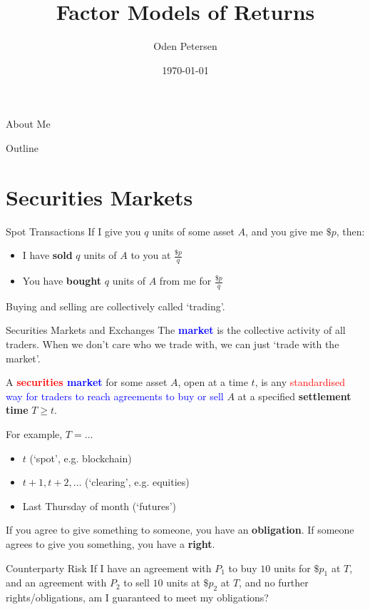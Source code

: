 \documentclass{beamer}
\title[Short Title]{Factor Models of Returns}
\author[Your Name]{Oden Petersen}
\date{\today}
\begin{document}
\begin{frame}
	\titlepage
\end{frame}

\begin{frame}{About Me}
\end{frame}

\begin{frame}{Outline}
	\tableofcontents
\end{frame}

\section{Securities Markets}

\begin{frame}{Spot Transactions}
	If I give you $q$ units of some asset $A$, and you give me $\$p$, then:
	\begin{itemize}
		\item I have \textbf{sold} $q$ units of $A$ to you at $\frac{\$p}{q}$
		\item You have \textbf{bought} $q$ units of $A$ from me for $\frac{\$p}{q}$
	\end{itemize}

	Buying and selling are collectively called `trading'.

\end{frame}

\begin{frame}{Securities Markets and Exchanges}
	The \textbf{\textcolor{blue}{market}} is the collective activity of all traders. When we don't care who we trade with, we can just `trade with the market'.

	A \textbf{\textcolor{red}{securities} \textcolor{blue}{market}} for some asset $A$, open at a time $t$, is any \textcolor{red}{standardised} \textcolor{blue}{way for traders to reach agreements to buy or sell} $A$ at a specified \textbf{settlement time} $T\geq t$.

	\pause

	For example, $T=\ldots$
	\begin{itemize}
		\item $t$ (`spot', e.g. blockchain)
		\item $t+1, t+2, \ldots$ (`clearing', e.g. equities)
		\item Last Thursday of month (`futures')
	\end{itemize}

	\pause
	If you agree to give something to someone, you have an \textbf{obligation}. If someone agrees to give you something, you have a \textbf{right}.

	\begin{block}{Counterparty Risk}
		If I have an agreement with $P_1$ to buy $10$ units for $\$p_1$ at $T$, and an agreement with $P_2$ to sell $10$ units at $\$p_2$ at $T$, and no further rights/obligations, am I guaranteed to meet my obligations?
	\end{block}
\end{frame}
\end{document}
